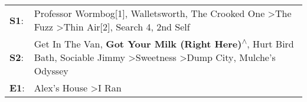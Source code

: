 \begin{supertabular}{p{0.03\textwidth}p{0.92\textwidth}}
 \textbf{S1}:  &                                       Professor Wormbog[1]\textsuperscript{}, \enspace Walletsworth\textsuperscript{}, \enspace The Crooked One\textsuperscript{} \textgreater \enspace The Fuzz\textsuperscript{} \textgreater \enspace Thin Air[2]\textsuperscript{}, \enspace Search 4\textsuperscript{}, \enspace 2nd Self\textsuperscript{}  \enspace  \\
 \textbf{S2}:  &  Get In The Van\textsuperscript{}, \enspace \textbf{Got Your Milk (Right Here)\textsuperscript{$\wedge$}}, \enspace Hurt Bird Bath\textsuperscript{}, \enspace Sociable Jimmy\textsuperscript{} \textgreater \enspace Sweetness\textsuperscript{} \textgreater \enspace Dump City\textsuperscript{}, \enspace Mulche's Odyssey\textsuperscript{}  \enspace  \\
 \textbf{E1}:  &                                                                                                                                                                                                                                                                     Alex's House\textsuperscript{} \textgreater \enspace I Ran\textsuperscript{}  \enspace  \\
\end{supertabular}
